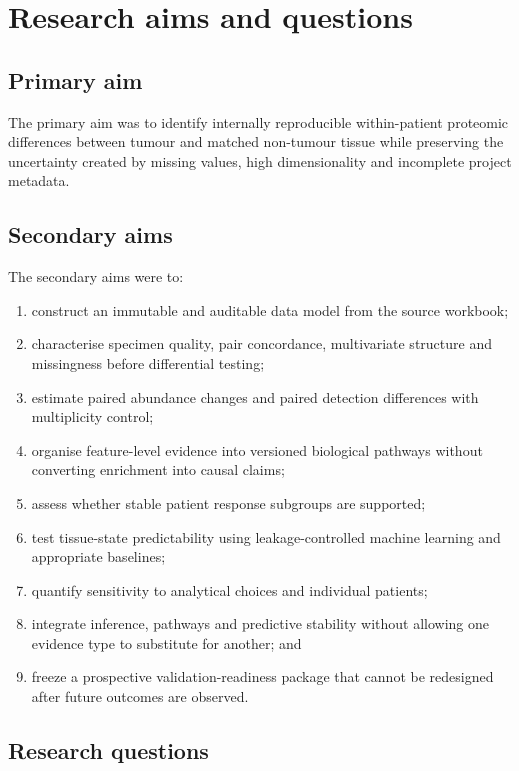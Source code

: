 \chapter{Research aims and questions}
\label{chap:research_aims_and_questions}

\section{Primary aim}
\label{sec:primary_aim}

The primary aim was to identify internally reproducible within-patient proteomic differences between tumour and matched non-tumour tissue while preserving the uncertainty created by missing values, high dimensionality and incomplete project metadata.

\section{Secondary aims}
\label{sec:secondary_aims}

The secondary aims were to:

\begin{enumerate}
\item construct an immutable and auditable data model from the source workbook;
\item characterise specimen quality, pair concordance, multivariate structure and missingness before differential testing;
\item estimate paired abundance changes and paired detection differences with multiplicity control;
\item organise feature-level evidence into versioned biological pathways without converting enrichment into causal claims;
\item assess whether stable patient response subgroups are supported;
\item test tissue-state predictability using leakage-controlled machine learning and appropriate baselines;
\item quantify sensitivity to analytical choices and individual patients;
\item integrate inference, pathways and predictive stability without allowing one evidence type to substitute for another; and
\item freeze a prospective validation-readiness package that cannot be redesigned after future outcomes are observed.
\end{enumerate}

\section{Research questions}
\label{sec:research_questions}

